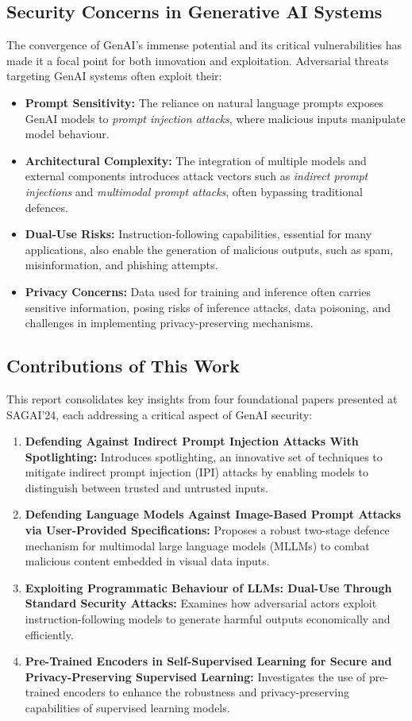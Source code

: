 \documentclass[journal]{IEEEtran}  %
\begin{document}
\subsection{Security Concerns in Generative AI Systems}
The convergence of GenAI’s immense potential and its critical vulnerabilities has made it a focal point for both innovation and exploitation. Adversarial threats targeting GenAI systems often exploit their:
\begin{itemize}
    \item \textbf{Prompt Sensitivity:} The reliance on natural language prompts exposes GenAI models to \textit{prompt injection attacks}, where malicious inputs manipulate model behaviour.
    \item \textbf{Architectural Complexity:} The integration of multiple models and external components introduces attack vectors such as \textit{indirect prompt injections} and \textit{multimodal prompt attacks}, often bypassing traditional defences.
    \item \textbf{Dual-Use Risks:} Instruction-following capabilities, essential for many applications, also enable the generation of malicious outputs, such as spam, misinformation, and phishing attempts.
    \item \textbf{Privacy Concerns:} Data used for training and inference often carries sensitive information, posing risks of inference attacks, data poisoning, and challenges in implementing privacy-preserving mechanisms.
\end{itemize}

\subsection{Contributions of This Work}
This report consolidates key insights from four foundational papers presented at SAGAI'24, each addressing a critical aspect of GenAI security:
\begin{enumerate}
    \item \textbf{Defending Against Indirect Prompt Injection Attacks With Spotlighting:} Introduces spotlighting, an innovative set of techniques to mitigate indirect prompt injection (IPI) attacks by enabling models to distinguish between trusted and untrusted inputs.
    \item \textbf{Defending Language Models Against Image-Based Prompt Attacks via User-Provided Specifications:} Proposes a robust two-stage defence mechanism for multimodal large language models (MLLMs) to combat malicious content embedded in visual data inputs.
    \item \textbf{Exploiting Programmatic Behaviour of LLMs: Dual-Use Through Standard Security Attacks:} Examines how adversarial actors exploit instruction-following models to generate harmful outputs economically and efficiently.
    \item \textbf{Pre-Trained Encoders in Self-Supervised Learning for Secure and Privacy-Preserving Supervised Learning:} Investigates the use of pre-trained encoders to enhance the robustness and privacy-preserving capabilities of supervised learning models.
\end{enumerate}
\end{document}
